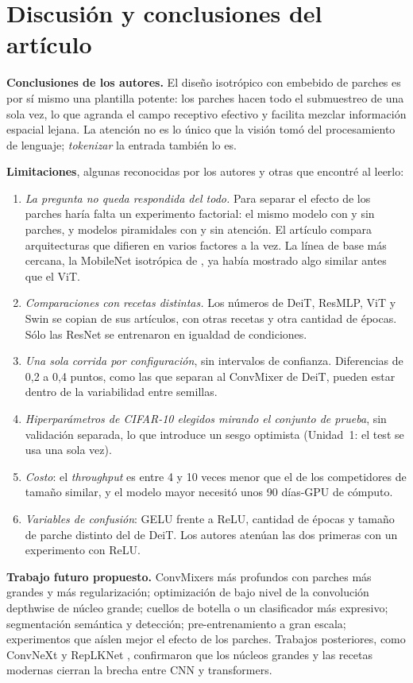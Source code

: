 \documentclass[11pt,a4paper]{article}
\begin{document}
\section{Discusión y conclusiones del artículo}
\textbf{Conclusiones de los autores.} El diseño isotrópico con embebido de parches es por sí mismo una plantilla
potente: los parches hacen todo el submuestreo de una sola vez, lo que agranda el campo receptivo efectivo y
facilita mezclar información espacial lejana. La atención no es lo único que la visión tomó del procesamiento de
lenguaje; \emph{tokenizar} la entrada también lo es.

\textbf{Limitaciones}, algunas reconocidas por los autores y otras que encontré al leerlo:
\begin{enumerate}
  \item \emph{La pregunta no queda respondida del todo.} Para separar el efecto de los parches haría falta un
  experimento factorial: el mismo modelo con y sin parches, y modelos piramidales con y sin atención. El artículo
  compara arquitecturas que difieren en varios factores a la vez. La línea de base más cercana, la MobileNet
  isotrópica de \citet{sandler}, ya había mostrado algo similar antes que el ViT.
  \item \emph{Comparaciones con recetas distintas.} Los números de DeiT, ResMLP, ViT y Swin se copian de sus
  artículos, con otras recetas y otra cantidad de épocas. Sólo las ResNet se entrenaron en igualdad de condiciones.
  \item \emph{Una sola corrida por configuración}, sin intervalos de confianza. Diferencias de 0,2 a 0,4 puntos,
  como las que separan al ConvMixer de DeiT, pueden estar dentro de la variabilidad entre semillas.
  \item \emph{Hiperparámetros de CIFAR-10 elegidos mirando el conjunto de prueba}, sin validación separada, lo que
  introduce un sesgo optimista (Unidad~1: el test se usa una sola vez).
  \item \emph{Costo}: el \emph{throughput} es entre 4 y 10 veces menor que el de los competidores de tamaño similar, y el modelo mayor
  necesitó unos 90 días-GPU de cómputo.
  \item \emph{Variables de confusión}: GELU frente a ReLU, cantidad de épocas y tamaño de parche distinto del de
  DeiT. Los autores atenúan las dos primeras con un experimento con ReLU.
\end{enumerate}

\textbf{Trabajo futuro propuesto.} ConvMixers más profundos con parches más grandes y más regularización;
optimización de bajo nivel de la convolución depthwise de núcleo grande; cuellos de botella o un clasificador más
expresivo; segmentación semántica y detección; pre-entrenamiento a gran escala; experimentos que aíslen mejor el
efecto de los parches. Trabajos posteriores, como ConvNeXt \citep{convnext} y RepLKNet \citep{replknet}, confirmaron que los núcleos grandes y las
recetas modernas cierran la brecha entre CNN y transformers.
\end{document}
